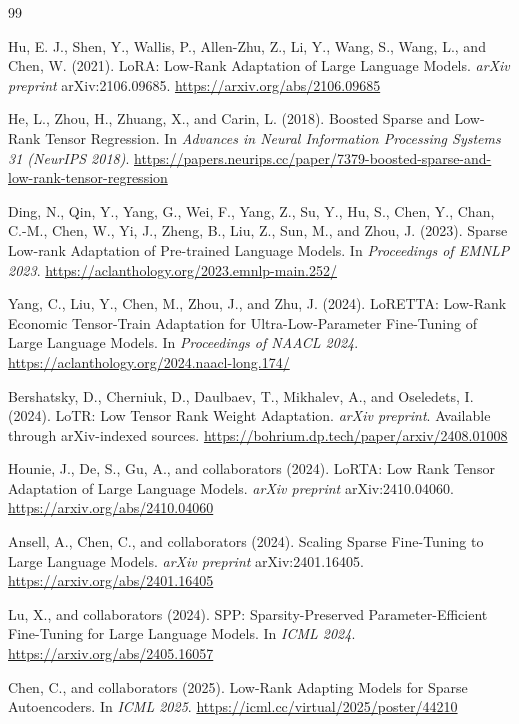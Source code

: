 \documentclass[11pt]{article}
\begin{document}
\begin{thebibliography}{99}

Hu, E. J., Shen, Y., Wallis, P., Allen-Zhu, Z., Li, Y., Wang, S., Wang, L., and Chen, W. (2021).
\newblock LoRA: Low-Rank Adaptation of Large Language Models.
\newblock \emph{arXiv preprint} arXiv:2106.09685.
\newblock \url{https://arxiv.org/abs/2106.09685}

He, L., Zhou, H., Zhuang, X., and Carin, L. (2018).
\newblock Boosted Sparse and Low-Rank Tensor Regression.
\newblock In \emph{Advances in Neural Information Processing Systems 31 (NeurIPS 2018)}.
\newblock \url{https://papers.neurips.cc/paper/7379-boosted-sparse-and-low-rank-tensor-regression}

Ding, N., Qin, Y., Yang, G., Wei, F., Yang, Z., Su, Y., Hu, S., Chen, Y., Chan, C.-M., Chen, W., Yi, J., Zheng, B., Liu, Z., Sun, M., and Zhou, J. (2023).
\newblock Sparse Low-rank Adaptation of Pre-trained Language Models.
\newblock In \emph{Proceedings of EMNLP 2023}.
\newblock \url{https://aclanthology.org/2023.emnlp-main.252/}

Yang, C., Liu, Y., Chen, M., Zhou, J., and Zhu, J. (2024).
\newblock LoRETTA: Low-Rank Economic Tensor-Train Adaptation for Ultra-Low-Parameter Fine-Tuning of Large Language Models.
\newblock In \emph{Proceedings of NAACL 2024}.
\newblock \url{https://aclanthology.org/2024.naacl-long.174/}

Bershatsky, D., Cherniuk, D., Daulbaev, T., Mikhalev, A., and Oseledets, I. (2024).
\newblock LoTR: Low Tensor Rank Weight Adaptation.
\newblock \emph{arXiv preprint}. Available through arXiv-indexed sources.
\newblock \url{https://bohrium.dp.tech/paper/arxiv/2408.01008}

Hounie, J., De, S., Gu, A., and collaborators (2024).
\newblock LoRTA: Low Rank Tensor Adaptation of Large Language Models.
\newblock \emph{arXiv preprint} arXiv:2410.04060.
\newblock \url{https://arxiv.org/abs/2410.04060}

Ansell, A., Chen, C., and collaborators (2024).
\newblock Scaling Sparse Fine-Tuning to Large Language Models.
\newblock \emph{arXiv preprint} arXiv:2401.16405.
\newblock \url{https://arxiv.org/abs/2401.16405}

Lu, X., and collaborators (2024).
\newblock SPP: Sparsity-Preserved Parameter-Efficient Fine-Tuning for Large Language Models.
\newblock In \emph{ICML 2024}.
\newblock \url{https://arxiv.org/abs/2405.16057}

Chen, C., and collaborators (2025).
\newblock Low-Rank Adapting Models for Sparse Autoencoders.
\newblock In \emph{ICML 2025}.
\newblock \url{https://icml.cc/virtual/2025/poster/44210}

\end{thebibliography}
\end{document}
